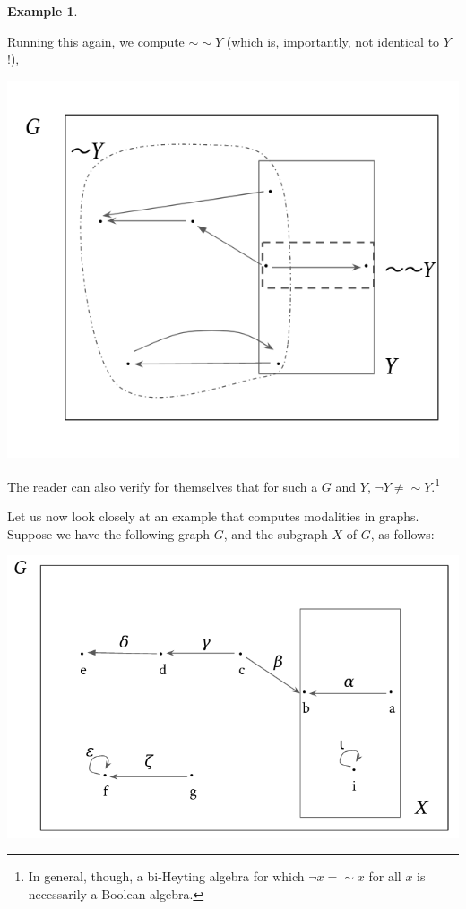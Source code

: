 \documentclass[a4paper]{book}
\theoremstyle{definition}
\newtheorem{example}{Example}[section]
\theoremstyle{definition}
\theoremstyle{definition}
\theoremstyle{theorem}
\theoremstyle{definition}
\begin{document}
\begin{example}
\begin{center}
	\end{center}
	Running this again, we compute $\sim \sim Y$ (which is, importantly, not identical to $Y$!),
	\begin{center}
		\includegraphics*[scale=0.3]{GraphNegationAlone3.png}
	\end{center}
	The reader can also verify for themselves that for such a $G$ and $Y$, $\neg Y \neq \sim Y$.\footnote{In general, though, a bi-Heyting algebra for which $\neg x = \sim x$ for all $x$ is necessarily a Boolean algebra.} \par 
	Let us now look closely at an example that computes modalities in graphs. Suppose we have the following graph $G$, and the subgraph $X$ of $G$, as follows: 
	\begin{center}
		\includegraphics*[scale=0.25]{GraphSubgraphNegation1.png}

\end{center}
\end{example}
\end{document}
